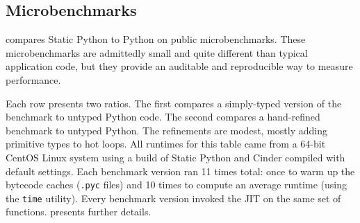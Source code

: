 \documentclass[english,cleveref,submission]{programming}
\newcommand{\SP}{Static Python}
\newcommand{\code}[1]{\texttt{#1}}
\begin{document}


%
%


\subsection{Microbenchmarks}
\label{s:microbenchmarks}

 compares \SP{} to Python on public microbenchmarks.
These microbenchmarks are admittedly small and quite different than typical application code,
but they provide an auditable and reproducible way to measure performance.

Each row presents two ratios.
The first compares a simply-typed version of the benchmark to untyped Python code.
The second compares a hand-refined benchmark to untyped Python.
The refinements are modest, mostly adding primitive types to hot loops.
All runtimes for this table came from a 64-bit CentOS Linux system using a build
of \SP{} and Cinder compiled with default settings.
Each benchmark version ran 11 times total: once to warm up the bytecode caches
(\code{.pyc} files) and 10 times to compute an average runtime (using the
\code{time} utility).
Every benchmark version invoked the JIT on the same set of functions.
 presents further details.
\end{document}

